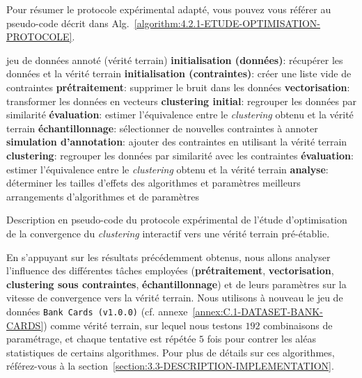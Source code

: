 			Pour résumer le protocole expérimental adapté, vous pouvez vous référer au pseudo-code décrit dans Alg.~\ref{algorithm:4.2.1-ETUDE-OPTIMISATION-PROTOCOLE}.
			\begin{algorithm}[!htb]
				\begin{algorithmic}[1]
					\Require jeu de données annoté (vérité terrain)
						\State \textbf{initialisation (données)}: récupérer les données et la vérité terrain
						\State \textbf{initialisation (contraintes)}: créer une liste vide de contraintes
						\State \textbf{prétraitement}: supprimer le bruit dans les données
						\State \textbf{vectorisation}: transformer les données en vecteurs
						\State \textbf{clustering initial}: regrouper les données par similarité
						\State \textbf{évaluation}: estimer l'équivalence entre le \textit{clustering} obtenu et la vérité terrain
						\Repeat
							\State \textbf{échantillonnage}: sélectionner de nouvelles contraintes à annoter
							\State \textbf{simulation d'annotation}: ajouter des contraintes en utilisant la vérité terrain
							\State \textbf{clustering}: regrouper les données par similarité avec les contraintes
							\State \textbf{évaluation}: estimer l'équivalence entre le \textit{clustering} obtenu et la vérité terrain
					\EndFor
					\State \textbf{analyse}: déterminer les tailles d'effets des algorithmes et paramètres
					\Ensure meilleurs arrangements d'algorithmes et de paramètres
				\end{algorithmic}
				\caption{Description en pseudo-code du protocole expérimental de l'étude d'optimisation de la convergence du \textit{clustering} interactif vers une vérité terrain pré-établie.}
				\label{algorithm:4.2.1-ETUDE-OPTIMISATION-PROTOCOLE}
			\end{algorithm}
			
			En s'appuyant sur les résultats précédemment obtenus,
			nous allons analyser l'influence des différentes tâches employées (\textbf{prétraitement}, \textbf{vectorisation}, \textbf{clustering sous contraintes}, \textbf{échantillonnage}) et de leurs paramètres sur la vitesse de convergence vers la vérité terrain.
			Nous utilisons à nouveau le jeu de données \texttt{Bank Cards (v1.0.0)} (cf. annexe~\ref{annex:C.1-DATASET-BANK-CARDS}) comme vérité terrain, sur lequel nous testons $192$ combinaisons de paramétrage, et chaque tentative est répétée $5$ fois pour contrer les aléas statistiques de certains algorithmes.
			Pour plus de détails sur ces algorithmes, référez-vous à la section~\ref{section:3.3-DESCRIPTION-IMPLEMENTATION}.
			
